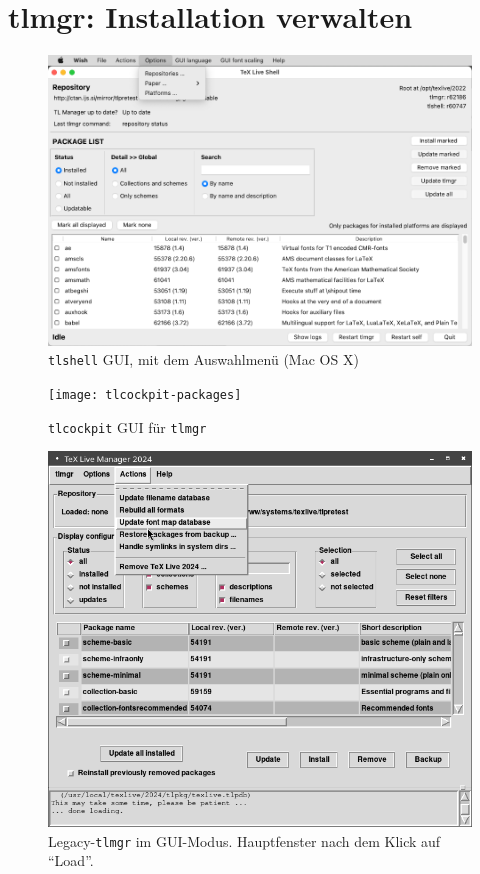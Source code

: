 \documentclass[12pt,ngerman,a4paper,fullparskip]{scrreprt}
\newcommand{\prog}[1]{\texttt{#1}}
\begin{document}
\chapter{tlmgr: Installation verwalten}\label{sec:tlmgr}

\begin{figure}[tb]
\includegraphics[width=\linewidth]{tlshell-macos}
\caption{\prog{tlshell} GUI, mit dem Auswahlmenü (Mac OS X)}
\label{fig:tlshell}
\end{figure}

\begin{figure}[tb]
\texttt{[image: tlcockpit-packages]}
\caption{\prog{tlcockpit} GUI für \prog{tlmgr}}
\label{fig:tlcockpit}
\end{figure}

\begin{figure}[tb]
\includegraphics[width=\linewidth]{tlmgr-gui}
\caption{Legacy-\prog{tlmgr} im GUI-Modus. Hauptfenster nach dem Klick auf \enquote{Load}.}\label{fig:tlmgr-gui}
\end{figure}
\end{document}
